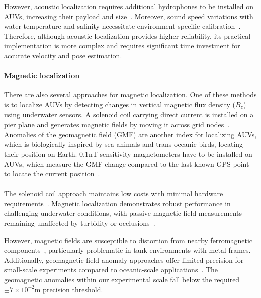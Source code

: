 \documentclass[11pt]{article}
\begin{document}
        However, acoustic localization requires additional hydrophones to be installed on AUVs, increasing their payload and size~\cite{bosser_broadband_2024}. Moreover, sound speed variations with water temperature and salinity necessitate environment-specific calibration~\cite{bosser_broadband_2024}. Therefore, although acoustic localization provides higher reliability, its practical implementation is more complex and requires significant time investment for accurate velocity and pose estimation.
        \paragraph{Magnetic localization}
        There are also several approaches for magnetic localization. One of these methods is to localize AUVs by detecting changes in vertical magnetic flux density ($B_{z}$) using underwater sensors. A solenoid coil carrying direct current is installed on a pier plane and generates magnetic fields by moving it across grid nodes~\cite{zhou_localization_2022}. Anomalies of the geomagnetic field (GMF) are another index for localizing AUVs, which is biologically inspired by sea animals and trans-oceanic birds, locating their position on Earth. 0.1nT sensitivity magnetometers have to be installed on AUVs, which measure the GMF change compared to the last known GPS point to locate the current position~\cite{gidugu_bio-inspired_2024}.\\\\
        The solenoid coil approach maintains low costs with minimal hardware requirements~\cite{zhou_localization_2022}. Magnetic localization demonstrates robust performance in challenging underwater conditions, with passive magnetic field measurements remaining unaffected by turbidity or occlusions~\cite{gidugu_bio-inspired_2024,zhou_localization_2022}.

        However, magnetic fields are susceptible to distortion from nearby ferromagnetic components~\cite{zhou_localization_2022}, particularly problematic in tank environments with metal frames. Additionally, geomagnetic field anomaly approaches offer limited precision for small-scale experiments compared to oceanic-scale applications~\cite{gidugu_bio-inspired_2024}. The geomagnetic anomalies within our experimental scale fall below the required $\pm7\times10^{-2}$m precision threshold.
\end{document}
